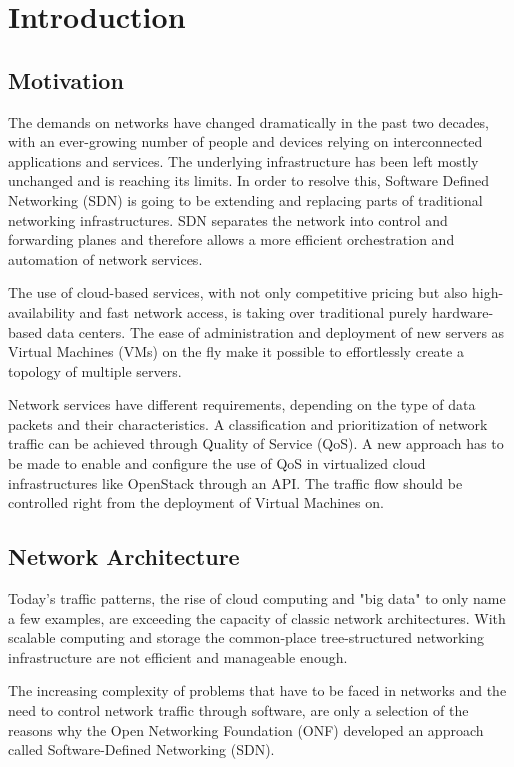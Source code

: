 \chapter{Introduction}
\label{chapter_introduction}



\section{Motivation}

The demands on networks have changed dramatically in the past two decades, with an ever-growing number of people and devices relying on interconnected applications and services. The underlying infrastructure has been left mostly unchanged and is reaching its limits. In order to resolve this, Software Defined Networking (SDN) is going to be extending and replacing parts of traditional networking infrastructures. SDN separates the network into control and forwarding planes and therefore allows a more efficient orchestration and automation of network services.

The use of cloud-based services, with not only competitive pricing but also high-availability and fast network access,  is taking over traditional purely hardware-based data centers. The ease of administration and deployment of new servers as Virtual Machines (VMs) on the fly make it possible to effortlessly create a topology of multiple servers.

Network services have different requirements, depending on the type of data packets and their characteristics. A classification and prioritization of network traffic can be achieved through Quality of Service (QoS). A new approach has to be made to enable and configure the use of QoS in virtualized cloud infrastructures like OpenStack through an API. The traffic flow should be controlled right from the deployment of Virtual Machines on.


\section{Network Architecture}
Today's traffic patterns, the rise of cloud computing and "big data" to only name a few examples, are exceeding the capacity of classic network architectures. With scalable computing and storage the common-place tree-structured networking infrastructure are not efficient and manageable enough. 

The increasing complexity of problems that have to be faced in networks and the need to control network traffic through software, are only a selection of the reasons why the Open Networking Foundation (ONF) developed an approach called Software-Defined Networking (SDN).

